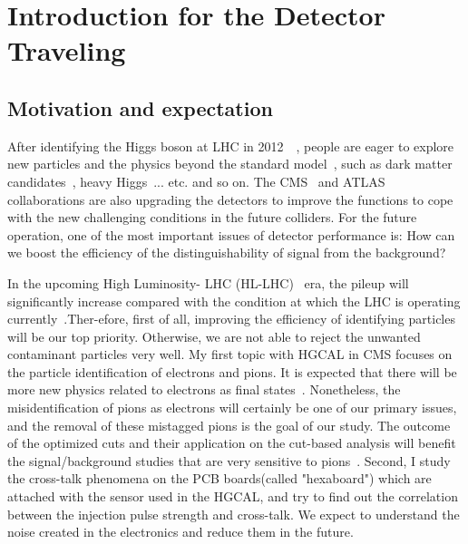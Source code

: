 \documentclass[12pt,twoside,a4paper,an,final]{cms-tdr}
\begin{document}
\section{Introduction for the Detector Traveling}
\subsection{Motivation and expectation}
After identifying the Higgs boson at LHC in 2012~\cite{Chatrchyan:2012xdj}~\cite{Aad:2012tfa}, people are eager to explore new particles and the physics beyond the standard model~\cite{Sirunyan:2018wnk}, such as dark matter candidates~\cite{Abercrombie:2015wmb}, heavy Higgs~\cite{Pelliccioni:2015hva}... etc. and so on. The CMS~\cite{Chatrchyan:2008aa} and ATLAS~\cite{Aad:2008zzm} collaborations are also upgrading the detectors to improve the functions to cope with the new challenging conditions in the future colliders. For the future operation, one of the most important issues of detector performance is: How can we boost the efficiency of the distinguishability of signal from the background?

In the upcoming High Luminosity- LHC (HL-LHC)~\cite{Apollinari:2017cqg} era, the pileup will significantly increase compared with the condition at which the LHC is operating currently~\cite{MedinaMedrano:2289694}.Ther-efore, first of all, improving the efficiency of identifying particles will be our top priority. Otherwise, we are not able to reject the unwanted contaminant particles very well. My first topic with HGCAL\cite{Collaboration:2293646} in CMS focuses on the particle identification of electrons and pions. It is expected that there will be more new physics related to electrons as final states~\cite{Sirunyan:2018qob}. Nonetheless, the misidentification of pions as electrons will certainly be one of our primary issues, and the removal of these mistagged pions is the goal of our study. The outcome of the optimized cuts and their application on the cut-based analysis will benefit the signal/background studies that are very sensitive to pions~\cite{Rimoldi:2663190}. Second, I study the cross-talk phenomena on the PCB boards(called "hexaboard") which are attached with the sensor used in the HGCAL, and try to find out the correlation between the injection pulse strength and cross-talk. We expect to understand the noise created in the electronics and reduce them in the future.
\end{document}
